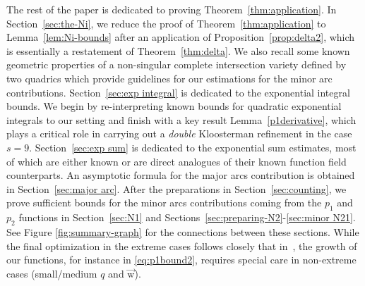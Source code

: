 \documentclass[letterpaper,11pt]{amsart}
\numberwithin{equation}{section}
\theoremstyle{definition}
\numberwithin{equation}{section}
\newcommand{\uw}{{\vec{\mathrm{w}}}}
\begin{document}
The rest of the paper is dedicated to proving Theorem~\ref{thm:application}. In Section~\ref{sec:the-Ni}, we reduce the proof of Theorem~\ref{thm:application} to Lemma~\ref{lem:Ni-bounds} after an application of Proposition~\ref{prop:delta2}, which is essentially a restatement of Theorem~\ref{thm:delta}. We also recall some known geometric properties of a non-singular complete intersection variety defined by two quadrics which provide guidelines for our estimations for the minor arc contributions. Section~\ref{sec:exp integral} is dedicated to the exponential integral bounds. 
We begin by re-interpreting known bounds for quadratic exponential integrals to our setting and finish with a key result Lemma~\ref{p1derivative}, which plays a critical role in carrying out a \emph{double} Kloosterman refinement in the case $s=9$. Section~\ref{sec:exp sum} is dedicated to the exponential sum estimates, most of which are either known or are direct analogues of their known function field counterparts. An asymptotic formula for the major arcs contribution is obtained in Section~\ref{sec:major arc}. After the preparations in Section~\ref{sec:counting}, we prove sufficient bounds for the minor arcs contributions coming from the $p_1$ and $p_2$ functions in Section~\ref{sec:N1} and Sections~\ref{sec:preparing-N2}-\ref{sec:minor N21}. See Figure \ref{fig:summary-graph} for the connections between these sections. While the final optimization in the extreme cases follows closely that in~\cite{V19}, the growth of our functions, for instance in \eqref{eq:p1bound2}, requires special care in non-extreme cases (small/medium $q$ and $\uw$). 
\end{document}
